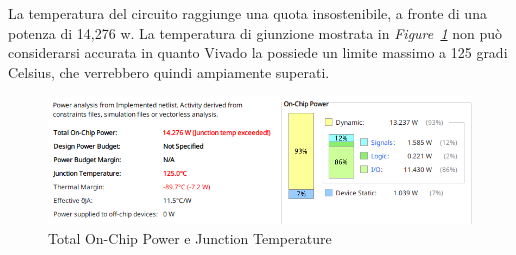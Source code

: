 La temperatura del circuito raggiunge una quota insostenibile, a fronte di una potenza di 14,276 w. La temperatura di giunzione mostrata in \textit{Figure~\ref{16bit_power}} non può considerarsi 
accurata in quanto Vivado la possiede un limite massimo a 125 gradi Celsius, che verrebbero quindi ampiamente superati.
\begin{figure}[ht]
  \centering
  \includegraphics[width=1\textwidth]{assets/simulations/Post_Implementation/16bit/power.png}
  \caption{Total On-Chip Power e Junction Temperature}
  \label{16bit_power} 
\end{figure}
\FloatBarrier

